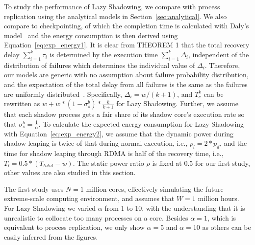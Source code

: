 To study the performance of Lazy Shadowing, we compare with process replication using the analytical models in Section~\ref{sec:analytical}. We also compare to checkpointing, of which the completion time is calculated with Daly's model~\cite{daly_fgcs_2006} and the energy consumption is then derived using Equation~\ref{eq:exp_energy1}. 
It is clear from THEOREM 1 that the total recovery delay $\sum_{i=1}^k\tau_i$ is determined by the execution time $\sum_{i=1}^k\Delta_i$, independent of the distribution of failures which determines 
the individual value of $\Delta_i$. 
Therefore, our models are generic with no assumption about failure probability distribution, and the expectation of the total delay from all failures is the same as the failures are uniformly distributed~\cite{daly_fgcs_2006}. Specifically, $\Delta_i = w/(k+1)$, and $T_c^k$ can be rewritten as $w + w*(1-\sigma_s^b)*\frac{k}{k+1}$ for Lazy Shadowing. Further, we assume that each shadow process gets a fair share of its shadow core's execution rate so that $\sigma_s^b = \frac{1}{\alpha}$. %
To calculate the expected energy consumption for Lazy Shadowing with Equation~\ref{eq:exp_energy2}, we assume that the dynamic power during shadow leaping is twice of that during normal execution, i.e., $p_{l}=2*p_d$, and the time for shadow leaping through RDMA is half of the recovery time, i.e., $T_l=0.5*(T_{total} - w)$. The static power ratio $\rho$ is fixed at 0.5 for our first study, other values are also studied in this section.

The first study uses $N=1$ million cores, effectively simulating the future extreme-scale computing environment, and assumes that $W=1$ million hours. 
For Lazy Shadowing we varied $\alpha$ from 1 to 10, with the understanding that it is unrealistic to collocate too many processes on a core. Besides $\alpha=1$, which is equivalent to process replication, we only show $\alpha=5$ and $\alpha=10$ as others can be easily inferred from the figures.

